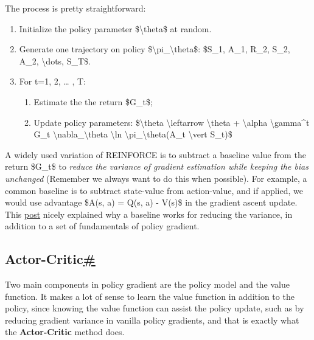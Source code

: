 The process is pretty straightforward:

\begin{enumerate}
\tightlist
\item
  Initialize the policy parameter \$\textbackslash theta\$ at random.
\item
  Generate one trajectory on policy \$\textbackslash pi\_\textbackslash theta\$: \$S\_1, A\_1, R\_2, S\_2, A\_2, \textbackslash dots, S\_T\$.
\item
  For t=1, 2, \ldots{} , T:

  \begin{enumerate}
  \tightlist
  \item
    Estimate the the return \$G\_t\$;
  \item
    Update policy parameters: \$\textbackslash theta \textbackslash leftarrow \textbackslash theta + \textbackslash alpha \textbackslash gamma\^{}t G\_t \textbackslash nabla\_\textbackslash theta \textbackslash ln \textbackslash pi\_\textbackslash theta(A\_t \textbackslash vert S\_t)\$
  \end{enumerate}
\end{enumerate}

A widely used variation of REINFORCE is to subtract a baseline value from the return \$G\_t\$ to \emph{reduce the variance of gradient estimation while keeping the bias unchanged} (Remember we always want to do this when possible). For example, a common baseline is to subtract state-value from action-value, and if applied, we would use advantage \$A(s, a) = Q(s, a) - V(s)\$ in the gradient ascent update. This \href{https://danieltakeshi.github.io/2017/03/28/going-deeper-into-reinforcement-learning-fundamentals-of-policy-gradients/}{post} nicely explained why a baseline works for reducing the variance, in addition to a set of fundamentals of policy gradient.

\subsection{\texorpdfstring{Actor-Critic\hyperref[actor-critic]{\#}}{Actor-Critic\#}}\label{actor-critic}

Two main components in policy gradient are the policy model and the value function. It makes a lot of sense to learn the value function in addition to the policy, since knowing the value function can assist the policy update, such as by reducing gradient variance in vanilla policy gradients, and that is exactly what the \textbf{Actor-Critic} method does.

